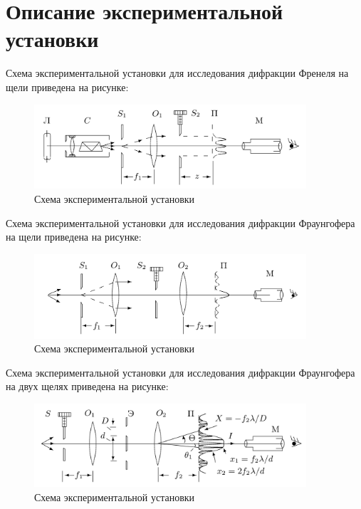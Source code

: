\section*{Описание экспериментальной установки}

Схема экспериментальной установки для исследования дифракции Френеля на щели приведена на рисунке:

\begin{figure}[H]
	\centering
	\includegraphics[width=0.9\textwidth]{../Изображения/Схема установки. Дифракция Френеля.png}
	\caption{Схема экспериментальной установки}
\end{figure}

Схема экспериментальной установки для исследования дифракции Фраунгофера на щели приведена на рисунке:

\begin{figure}[H]
	\centering
	\includegraphics[width=0.9\textwidth]{../Изображения/Схема установки. Дифракция Фраунгофера.png}
	\caption{Схема экспериментальной установки}
\end{figure}

Схема экспериментальной установки для исследования дифракции Фраунгофера на двух щелях приведена на рисунке:

\begin{figure}[H]
	\centering
	\includegraphics[width=0.9\textwidth]{../Изображения/Схема установки. Дифракция Фраунгофера, две щели.png}
	\caption{Схема экспериментальной установки}
\end{figure}


